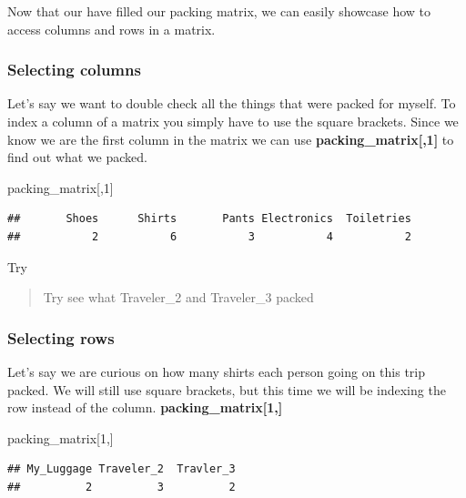 \documentclass[
]{book}
\newenvironment{Shaded}{\begin{snugshade}}{\end{snugshade}}
\newcommand{\DecValTok}[1]{\textcolor[rgb]{0.00,0.00,0.81}{#1}}
\newcommand{\NormalTok}[1]{#1}
\begin{document}
Now that our have filled our packing matrix, we can easily showcase how to access columns and rows in a matrix.

\hypertarget{selecting-columns}{%
\subsubsection{Selecting columns}\label{selecting-columns}}

Let's say we want to double check all the things that were packed for myself. To index a column of a matrix you simply have to use the square brackets. Since we know we are the first column in the matrix we can use \textbf{packing\_matrix{[},1{]}} to find out what we packed.

\begin{Shaded}
\begin{Highlighting}[]
\NormalTok{packing\_matrix[,}\DecValTok{1}\NormalTok{]}
\end{Highlighting}
\end{Shaded}

\begin{verbatim}
##       Shoes      Shirts       Pants Electronics  Toiletries 
##           2           6           3           4           2
\end{verbatim}

Try

\begin{quote}
Try see what Traveler\_2 and Traveler\_3 packed
\end{quote}

\hypertarget{selecting-rows}{%
\subsubsection{Selecting rows}\label{selecting-rows}}

Let's say we are curious on how many shirts each person going on this trip packed. We will still use square brackets, but this time we will be indexing the row instead of the column. \textbf{packing\_matrix{[}1,{]}}

\begin{Shaded}
\begin{Highlighting}[]
\NormalTok{packing\_matrix[}\DecValTok{1}\NormalTok{,]}
\end{Highlighting}
\end{Shaded}

\begin{verbatim}
## My_Luggage Traveler_2  Travler_3 
##          2          3          2
\end{verbatim}
\end{document}
